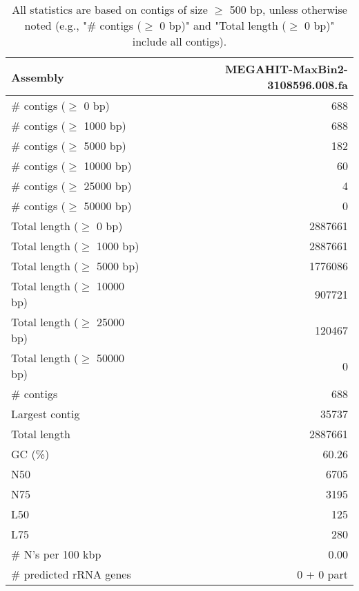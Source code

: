 \documentclass[12pt,a4paper]{article}
\begin{document}
\begin{table}[ht]
\begin{center}
\caption{All statistics are based on contigs of size $\geq$ 500 bp, unless otherwise noted (e.g., "\# contigs ($\geq$ 0 bp)" and "Total length ($\geq$ 0 bp)" include all contigs).}
\begin{tabular}{|l*{1}{|r}|}
\hline
Assembly & MEGAHIT-MaxBin2-3108596.008.fa \\ \hline
\# contigs ($\geq$ 0 bp) & 688 \\ \hline
\# contigs ($\geq$ 1000 bp) & 688 \\ \hline
\# contigs ($\geq$ 5000 bp) & 182 \\ \hline
\# contigs ($\geq$ 10000 bp) & 60 \\ \hline
\# contigs ($\geq$ 25000 bp) & 4 \\ \hline
\# contigs ($\geq$ 50000 bp) & 0 \\ \hline
Total length ($\geq$ 0 bp) & 2887661 \\ \hline
Total length ($\geq$ 1000 bp) & 2887661 \\ \hline
Total length ($\geq$ 5000 bp) & 1776086 \\ \hline
Total length ($\geq$ 10000 bp) & 907721 \\ \hline
Total length ($\geq$ 25000 bp) & 120467 \\ \hline
Total length ($\geq$ 50000 bp) & 0 \\ \hline
\# contigs & 688 \\ \hline
Largest contig & 35737 \\ \hline
Total length & 2887661 \\ \hline
GC (\%) & 60.26 \\ \hline
N50 & 6705 \\ \hline
N75 & 3195 \\ \hline
L50 & 125 \\ \hline
L75 & 280 \\ \hline
\# N's per 100 kbp & 0.00 \\ \hline
\# predicted rRNA genes & 0 + 0 part \\ \hline
\end{tabular}
\end{center}
\end{table}
\end{document}
